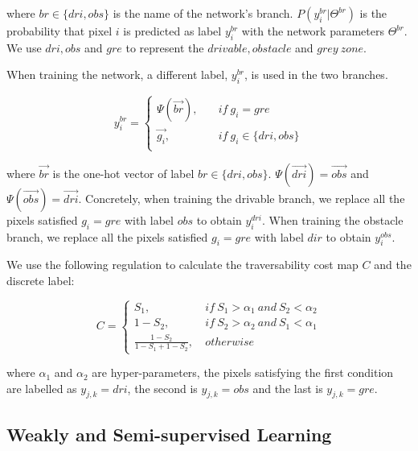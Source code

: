 \documentclass[letterpaper, 10 pt, conference]{ieeeconf}  %
\begin{document}
where $br\in\{dri, obs\}$ is the name of the network's branch. $P(y_i^{br}|\Theta^{br})$ is the probability that  pixel $i$ is predicted as label $y_i^{br}$ with the network parameters $\Theta^{br}$. We use $dri,obs$ and $gre$ to represent the $drivable, obstacle$ and $grey\ zone$.

When training the network, a different label, $y_i^{br}$, is used in the two branches. 

\vspace{-2mm}
\begin{equation}
y_i^{br}= 
\left\{
\begin{array}{ll}
\Psi(\vec{br}), &\quad if \ g_i = gre \\ 
\vec{g_i}, &\quad if \ g_i \in \{dri,obs \} \\
\end{array}
\right.
\end{equation}
\vspace{-3mm}

where $\vec{br}$ is the one-hot vector of label $br\in\{dri, obs\}$. $\Psi(\vec{dri})=\vec{obs}$ and $\Psi(\vec{obs})=\vec{dri}$. Concretely, when training the drivable branch, we replace all the pixels satisfied $g_i=gre$ with label $obs$ to obtain $y_i^{dri}$. When training the obstacle branch, we replace all the pixels satisfied $g_i=gre$ with label $dir$ to obtain $y_i^{obs}$.

We use the following regulation to calculate the traversability cost map $C$ and the discrete label:

\vspace{-3mm}
\begin{equation}
\label{equ:Cost}
C= 
\left\{
\begin{array}{ccc}
S_1, &\  if \ S_1>\alpha_1\ and\ S_2<\alpha_2\\ 
1-S_2, &\ if \ S_2>\alpha_2\ and\ S_1<\alpha_1\\
\frac{1-S_2}{1-S_1 + 1-S_2}, &\ otherwise
\end{array}
\right.
\end{equation}

where $\alpha_1$ and $\alpha_2$ are hyper-parameters, the pixels satisfying the first condition are labelled as $y_{j,k}=dri$, the second is $y_{j,k}=obs$ and the last is $y_{j,k}=gre$.

\subsection{Weakly and Semi-supervised Learning}
\end{document}
